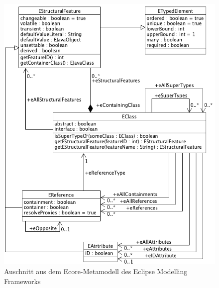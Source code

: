 \begin{figure}
\centering
\includegraphics[width=\linewidth]{Abschnitte/Abbildungen/Grafiken/EMF}
\caption{Auschnitt aus dem Ecore-Metamodell des Eclipse Modelling Frameworks \cite{eclipse_ecore}}
\label{fig:emf-ecore-kd}
\end{figure}
